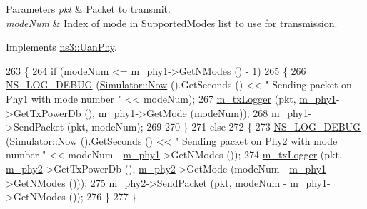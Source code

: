 \begin{DoxyParams}{Parameters}
{\em pkt} & \hyperlink{classns3_1_1Packet}{Packet} to transmit. \\
\hline
{\em mode\+Num} & Index of mode in Supported\+Modes list to use for transmission. \\
\hline
\end{DoxyParams}


Implements \hyperlink{classns3_1_1UanPhy_acf6edcd5eefae18a091b5d5a2344b9af}{ns3\+::\+Uan\+Phy}.


\begin{DoxyCode}
263 \{
264   \textcolor{keywordflow}{if} (modeNum <= m\_phy1->\hyperlink{classns3_1_1UanPhyDual_a21728bcc8d80fed73e9ae4d2fdd49964}{GetNModes} () - 1)
265     \{
266       \hyperlink{group__logging_ga413f1886406d49f59a6a0a89b77b4d0a}{NS\_LOG\_DEBUG} (\hyperlink{classns3_1_1Simulator_ac3178fa975b419f7875e7105be122800}{Simulator::Now} ().GetSeconds () << \textcolor{stringliteral}{" Sending packet on Phy1
       with mode number "} << modeNum);
267       \hyperlink{classns3_1_1UanPhyDual_a455f735d55ccdaaa2b5d593b22ea33ec}{m\_txLogger} (pkt, \hyperlink{classns3_1_1UanPhyDual_a044538c53fd54f356f33acf4957ab1e3}{m\_phy1}->GetTxPowerDb (), \hyperlink{classns3_1_1UanPhyDual_a044538c53fd54f356f33acf4957ab1e3}{m\_phy1}->GetMode (modeNum));
268       \hyperlink{classns3_1_1UanPhyDual_a044538c53fd54f356f33acf4957ab1e3}{m\_phy1}->SendPacket (pkt, modeNum);
269 
270     \}
271   \textcolor{keywordflow}{else}
272     \{
273       \hyperlink{group__logging_ga413f1886406d49f59a6a0a89b77b4d0a}{NS\_LOG\_DEBUG} (\hyperlink{classns3_1_1Simulator_ac3178fa975b419f7875e7105be122800}{Simulator::Now} ().GetSeconds () << \textcolor{stringliteral}{" Sending packet on Phy2
       with mode number "} << modeNum - \hyperlink{classns3_1_1UanPhyDual_a044538c53fd54f356f33acf4957ab1e3}{m\_phy1}->GetNModes ());
274       \hyperlink{classns3_1_1UanPhyDual_a455f735d55ccdaaa2b5d593b22ea33ec}{m\_txLogger} (pkt, \hyperlink{classns3_1_1UanPhyDual_a36497239aebc68ce6e20f166ab0fefc7}{m\_phy2}->GetTxPowerDb (), \hyperlink{classns3_1_1UanPhyDual_a36497239aebc68ce6e20f166ab0fefc7}{m\_phy2}->GetMode (modeNum - 
      \hyperlink{classns3_1_1UanPhyDual_a044538c53fd54f356f33acf4957ab1e3}{m\_phy1}->GetNModes ()));
275       \hyperlink{classns3_1_1UanPhyDual_a36497239aebc68ce6e20f166ab0fefc7}{m\_phy2}->SendPacket (pkt, modeNum - \hyperlink{classns3_1_1UanPhyDual_a044538c53fd54f356f33acf4957ab1e3}{m\_phy1}->GetNModes ());
276     \}
277 \}
\end{DoxyCode}


